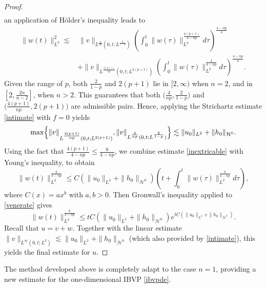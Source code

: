 \documentclass[preprint,compress,12pt]{elsarticle}
\numberwithin{equation}{section}
\begin{document}
\begin{proof}
\begin{equation}
\begin{aligned}
		\end{aligned}
	\end{equation}
	an application of  H\"{o}lder's inequality leads to
	\begin{equation}\label{inextricable}
		\begin{aligned}
			\|w(t)\|_{L^{2}}^{2}\lesssim &\, \|v\|_{L^{\frac{4}{np}}(0,t;L^{\frac{2}{1-p}})} \left(\int_{0}^{t}\|w(\tau)\|_{L^{2}}^{\frac{4(p+1)}{4-np}}d\tau\right)^{\frac{4-np}{4}} \\&+ \|v\|_{L^{\frac{4(p+1)}{np}}(0,t;    L^{2(p+1)})} \left(\int_{0}^{t}\|w(\tau)\|_{L^{2}}^{\frac{4}{4-np}}d\tau\right)^{\frac{4-np}{4}}.
		\end{aligned}
	\end{equation}
	Given the range of $p$, both $\frac{2}{1-p}$ and $2(p+1)$ lie in  $[2,\infty)$ when $n=2$, and in  $\left[2,\frac{2n}{n-2}\right]$, when $n>2$. This guarantees that both
	$\big(\frac{4}{np},\frac{2}{1-p}\big)$ and $\big(\frac{4(p+1)}{np},2(p+1)\big)$ are admissible pairs.	Hence, applying the Strichartz estimate \eqref{intimate} with $f=0$ yields
	\begin{equation}
		\max \Bigl\{ 	\|v\|_{L^{\frac{4(p+1)}{np}}(0,t  ;  L^{2(p+1)})},	\|v\|_{L^{\frac{4}{np}}(0,t;L^{\frac{2}{1-p}})}\Bigr\}\lesssim \|u_{0}\|_{L^{2}}+\|h_{0}\|_{\mathcal{H}^{0}}.
	\end{equation}
	Using the fact that $\frac{4(p+1)}{4-np}\leq \frac{8}{4-np}$, we combine estimate \eqref{inextricable} with Young's inequality, to obtain
	\begin{equation}\label{venerate}
		\|w(t)\|_{L^{2}}^{\frac{8}{4-np}}\leq C(\|u_{0}\|_{L^{2}}+\|h_{0}\|_{\mathcal{H}^{0}}) \left(t+\int_{0}^{t}\|w(\tau)\|_{L^{2}}^{\frac{8}{4-np}}d\tau\right),
	\end{equation}
	where $C(x)=ax^{b}$ with $a,b>0$. Then Gronwall's inequality applied to \eqref{venerate} gives
	\begin{equation}
		\|w(t)\|_{L^{2}}^\frac{8}{4-np}\leq tC(\|u_{0}\|_{L^{2}}+\|h_{0}\|_{\mathcal{H}^{0}})  e^{tC(\|u_{0}\|_{L^{2}}+\|h_{0}\|_{\mathcal{H}^{0}})}.
	\end{equation}
	Recall that $u=v+w$.  Together with the linear estimate $\|v\|_{L^{\infty}(0,t;L^{2})}\lesssim \|u_{0}\|_{L^{2}}+\|h_{0}\|_{\mathcal{H}^{0}}$ (which also provided by \eqref{intimate}), this yields the final estimate for $u$.
\end{proof}
The method developed above is completely adapt to the case $n=1$, providing a new estimate for the one-dimensional IBVP \eqref{ibvpde}.
\end{document}
